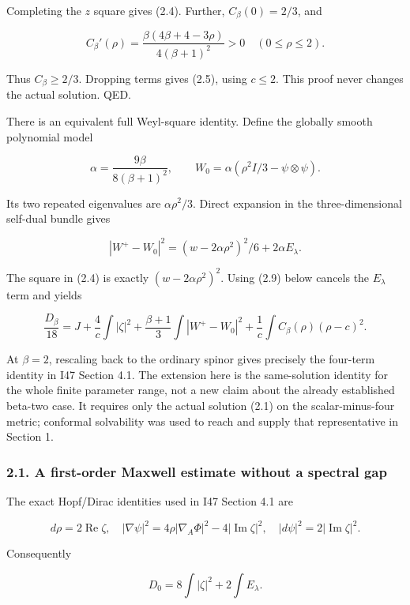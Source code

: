 \documentclass[
  11pt,
]{article}
\begin{document}
Completing the \(z\) square gives (2.4). Further, \(C_\beta(0)=2/3\),
and

\[
 C_\beta'(\rho)
 =\frac{\beta(4\beta+4-3\rho)}{4(\beta+1)^2}>0
 \quad (0\le\rho\le2).
\]

Thus \(C_\beta\ge2/3\). Dropping terms gives (2.5), using \(c\le2\).
This proof never changes the actual solution. QED.

There is an equivalent full Weyl-square identity. Define the globally
smooth polynomial model

\[
 \alpha=\frac{9\beta}{8(\beta+1)^2},\qquad
 W_0=\alpha(\rho^2 I/3-\psi\otimes\psi).
\]

Its two repeated eigenvalues are \(\alpha\rho^2/3\). Direct expansion in
the three-dimensional self-dual bundle gives

\[
 |W^+-W_0|^2=(w-2\alpha\rho^2)^2/6+2\alpha E_\lambda.
\]

The square in (2.4) is exactly \((w-2\alpha\rho^2)^2\). Using (2.9)
below cancels the \(E_\lambda\) term and yields

\[
 \boxed{\frac{D_\beta}{18}=J+\frac4c\int|\zeta|^2
 +\frac{\beta+1}{3}\int|W^+-W_0|^2
 +\frac1c\int C_\beta(\rho)(\rho-c)^2.}
 \tag{2.9a}
\]

At \(\beta=2\), rescaling back to the ordinary spinor gives precisely
the four-term identity in I47 Section 4.1. The extension here is the
same-solution identity for the whole finite parameter range, not a new
claim about the already established beta-two case. It requires only the
actual solution (2.1) on the scalar-minus-four metric; conformal
solvability was used to reach and supply that representative in Section
1.

\hypertarget{a-first-order-maxwell-estimate-without-a-spectral-gap}{%
\subsubsection{2.1. A first-order Maxwell estimate without a spectral
gap}\label{a-first-order-maxwell-estimate-without-a-spectral-gap}}

The exact Hopf/Dirac identities used in I47 Section 4.1 are

\[
 d\rho=2\operatorname{Re}\zeta,\quad
 |\nabla\psi|^2=4\rho|\nabla_A\Phi|^2
                       -4|\operatorname{Im}\zeta|^2,
 \quad |d\psi|^2=2|\operatorname{Im}\zeta|^2.
\]

Consequently

\[
 D_0=8\int|\zeta|^2+2\int E_\lambda.
 \tag{2.9}
\]
\end{document}

